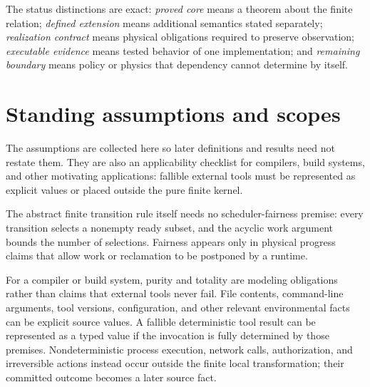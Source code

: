 The status distinctions are exact: \emph{proved core} means a theorem about the finite relation; \emph{defined extension} means additional semantics stated separately; \emph{realization contract} means physical obligations required to preserve observation; \emph{executable evidence} means tested behavior of one implementation; and \emph{remaining boundary} means policy or physics that dependency cannot determine by itself.

\section{Standing assumptions and scopes}\label{sec:assumptions}
The assumptions are collected here so later definitions and results need not restate them. They are also an applicability checklist for compilers, build systems, and other motivating applications: fallible external tools must be represented as explicit values or placed outside the pure finite kernel.

The abstract finite transition rule itself needs no scheduler-fairness premise: every transition selects a nonempty ready subset, and the acyclic work argument bounds the number of selections. Fairness appears only in physical progress claims that allow work or reclamation to be postponed by a runtime.

For a compiler or build system, purity and totality are modeling obligations rather than claims that external tools never fail. File contents, command-line arguments, tool versions, configuration, and other relevant environmental facts can be explicit source values. A fallible deterministic tool result can be represented as a typed value if the invocation is fully determined by those premises. Nondeterministic process execution, network calls, authorization, and irreversible actions instead occur outside the finite local transformation; their committed outcome becomes a later source fact.

